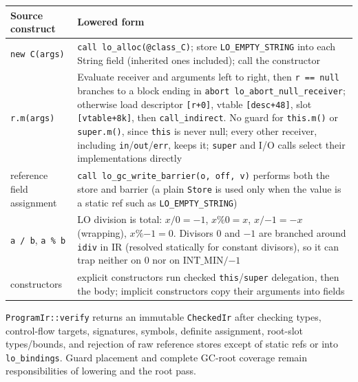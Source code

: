 \documentclass[10pt]{article}
\newcommand{\code}[1]{\texttt{\small #1}}
\begin{document}
\begin{center}\small
\begin{tabularx}{\linewidth}{@{}l X@{}}
\toprule
\textbf{Source construct} & \textbf{Lowered form} \\
\midrule
\code{new C(args)} & \code{call lo\_alloc(@class\_C)}; store \code{LO\_EMPTY\_STRING} into each String field (inherited ones included); call the constructor \\
\code{r.m(args)} & Evaluate receiver and arguments left to right, then \code{r == null} branches to a block ending in \code{abort lo\_abort\_null\_receiver}; otherwise load descriptor \code{[r+0]}, vtable \code{[desc+48]}, slot \code{[vtable+8k]}, then \code{call\_indirect}. No guard for \code{this.m()} or \code{super.m()}, since \code{this} is never null; every other receiver, including \code{in}/\code{out}/\code{err}, keeps it; \code{super} and I/O calls select their implementations directly \\
reference field assignment & \code{call lo\_gc\_write\_barrier(o, off, v)} performs both the store and barrier (a plain \code{Store} is used only when the value is a static ref such as \code{LO\_EMPTY\_STRING}) \\
\code{a / b}, \code{a \% b} & LO division is total: $x/0=-1$, $x\%0=x$, $x/{-1}=-x$ (wrapping), $x\%{-1}=0$. Divisors $0$ and $-1$ are branched around \code{idiv} in IR (resolved statically for constant divisors), so it can trap neither on $0$ nor on $\mathrm{INT\_MIN}/{-1}$ \\
constructors & explicit constructors run checked \code{this}/\code{super} delegation, then the body; implicit constructors copy their arguments into fields \\
\bottomrule
\end{tabularx}
\end{center}

\code{ProgramIr::verify} returns an immutable \code{CheckedIr} after checking types, control-flow targets, signatures, symbols, definite assignment, root-slot types/bounds, and rejection of raw reference stores except of static refs or into \code{lo\_bindings}. Guard placement and complete GC-root coverage remain responsibilities of lowering and the root pass.
\end{document}
